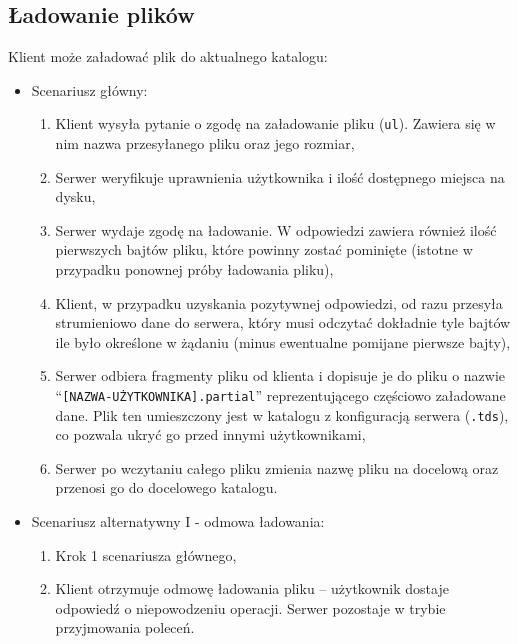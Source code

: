 \documentclass[8pt,a4paper]{article}
\newcommand{\quotes}[1]{``#1''}
\newcommand{\quotcode}[1]{\quotes{\texttt{#1}}}
\begin{document}
\subsection{Ładowanie plików}
\noindent Klient może załadować plik do aktualnego katalogu:
\begin{itemize}
    \item Scenariusz główny:
    \begin{enumerate}
        \item Klient wysyła pytanie o zgodę na załadowanie pliku (\texttt{ul}). Zawiera się w nim nazwa przesyłanego pliku oraz jego rozmiar,
        \item Serwer weryfikuje uprawnienia użytkownika i ilość dostępnego miejsca na dysku,
        \item Serwer wydaje zgodę na ładowanie. W odpowiedzi zawiera również ilość pierwszych bajtów pliku, które powinny zostać pominięte (istotne w przypadku ponownej próby ładowania pliku),
        \item Klient, w przypadku uzyskania pozytywnej odpowiedzi, od razu przesyła strumieniowo dane do serwera, który musi odczytać dokładnie tyle bajtów ile było określone w żądaniu (minus ewentualne pomijane pierwsze bajty),
        \item Serwer odbiera fragmenty pliku od klienta i dopisuje je do pliku o nazwie \quotcode{[NAZWA-UŻYTKOWNIKA].partial} reprezentującego częściowo załadowane dane. Plik ten umieszczony jest w katalogu z konfiguracją serwera (\texttt{.tds}), co pozwala ukryć go przed innymi użytkownikami,
        \item Serwer po wczytaniu całego pliku zmienia nazwę pliku na docelową oraz przenosi go do docelowego katalogu.
    \end{enumerate}

    \item Scenariusz alternatywny I - odmowa ładowania:
    \begin{enumerate}
        \item Krok 1 scenariusza głównego,
        \item Klient otrzymuje odmowę ładowania pliku -- użytkownik dostaje odpowiedź o niepowodzeniu operacji. Serwer pozostaje w trybie przyjmowania poleceń.
    \end{enumerate}


\end{itemize}
\end{document}
